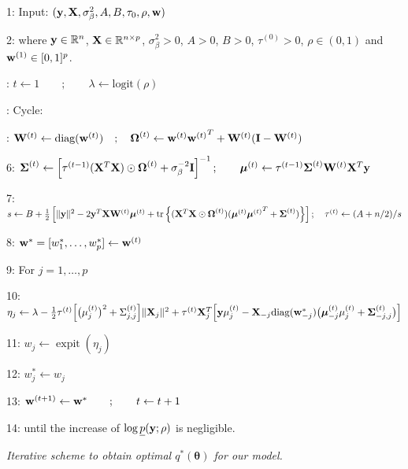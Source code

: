 \documentclass[11pt]{article}
\newtheorem{Main Result}{Main Result}
\def\vectorfontone{\bf}
\def\vectorfonttwo{\boldsymbol}
\def\vw{{\vectorfontone w}}                      %
\def\vy{{\vectorfontone y}}                      %
\def\vtheta{{\vectorfonttwo \theta}}             %
\def\vmu{{\vectorfonttwo \mu}}                   %
\def\matrixfontone{\bf}
\def\matrixfonttwo{\boldsymbol}
\def\mI{{\matrixfontone I}}                      %
\def\mW{{\matrixfontone W}}                      %
\def\mX{{\matrixfontone X}}                      %
\def\mSigma{{\matrixfonttwo \Sigma}}             %
\def\mOmega{{\matrixfonttwo \Omega}}             %
\def\vmuq{{\vmu}}
\def\mSigmaq{{\mSigma}}
\def\Aq{{A+n/2}}
\def\bR{{\mathbb R}}                             %
\def\tr{\text{tr}}
\DeclareMathOperator{\expit}{expit}
\newcommand{\joc}[1]{{\color{black}#1}}
\begin{document}
\newpage 



\setcounter{page}{30}


\joc{ 
	\begin{algorithm}
		\begin{minipage}[h]{\textwidth}
			\small{
				1: Input: $(\vy,\mX,\sigma_\beta^2,A,B,\tau_0,\rho,\vw)$
				
				2: where $\vy\in\bR^n$, $\mX\in\bR^{n\times p}$, $\sigma_\beta^2>0$,
				$A>0$, $B>0$, $\tau^{(0)}>0$, $\rho\in(0,1)$ and  \joc{$\vw^{(1)} \in [0,1]^p$}.
				
				\smallskip
				3: $t\leftarrow 1 \qquad ; \qquad \lambda \leftarrow \mbox{logit}(\rho)$
				
				
				
				\smallskip
				4: Cycle:
				
				\smallskip
				5: \qquad$\mW^{(t)} \leftarrow \mbox{diag}(\vw^{(t)}) \quad ; \quad
				\mOmega^{(t)} \leftarrow \vw^{(t)}{\vw^{(t)}}^T + \mW^{(t)}(\mI - \mW^{(t)})$
				
				6: \qquad $\mSigmaq^{(t)} \leftarrow \left[
				\tau^{(t-1)}(\mX^T\mX)\odot\mOmega^{(t)} + \sigma_\beta^{-2}\mI \right]^{-1}
				; \qquad
				\vmuq^{(t)} \leftarrow \tau^{(t-1)}\mSigmaq^{(t)}\mW^{(t)}\mX^T\vy$
				
				
				7: \qquad $s \leftarrow
				B + \tfrac{1}{2}\left[
				\|\vy\|^2
				- 2\vy^T\mX\mW^{(t)}\vmuq^{(t)}
				+ \tr\left\{ (\mX^T\mX\odot\mOmega^{(t)})(\vmuq^{(t)}{\vmuq^{(t)}}^T + \mSigmaq^{(t)})\right\}\right]
				; \quad
				\tau^{(t)} \leftarrow (\Aq)/s$
				
				
				8: \qquad $\vw^{*}=[w^*_1,\ldots,w^*_p] \leftarrow \vw^{(t)}$
				
				
				9: \qquad For $j=1,\ldots,p$
				
				
				10: \qquad\qquad $\eta_j
				\leftarrow
				\lambda
				- \tfrac{1}{2}\tau^{(t)}\Big[ \big(\mu_j^{(t)}\big)^2 + \Sigma_{j,j}^{(t)}\Big]\|\mX_j\|^2
				+ \tau^{(t)}\mX_j^T\Big[\vy\mu_j^{(t)} - \mX_{-j}\mbox{diag}(\vw_{-j}^{*})
				\big(\vmu_{-j}^{(t)}\mu_j^{(t)} + \mSigma_{-j,j}^{(t)}\big)\Big]$
				
				11: \qquad\qquad $w_j \leftarrow  \expit(\eta_j)$
				
				12: \qquad\qquad $w_j^* \leftarrow w_j$
				
				13: \quad\;\;$\vw^{(t+1)} \leftarrow \vw^{*}
				\qquad ; \qquad
				t\leftarrow t + 1$
				
				14: until the increase of $\log\underline{p}(\vy;\rho)$ is negligible.
			}
		\end{minipage}
		\caption{\it Iterative scheme to obtain optimal $q^{\ast}(\vtheta)$ for our model.}
		\label{alg:Algorithm1}
	\end{algorithm}
}
\end{document}
